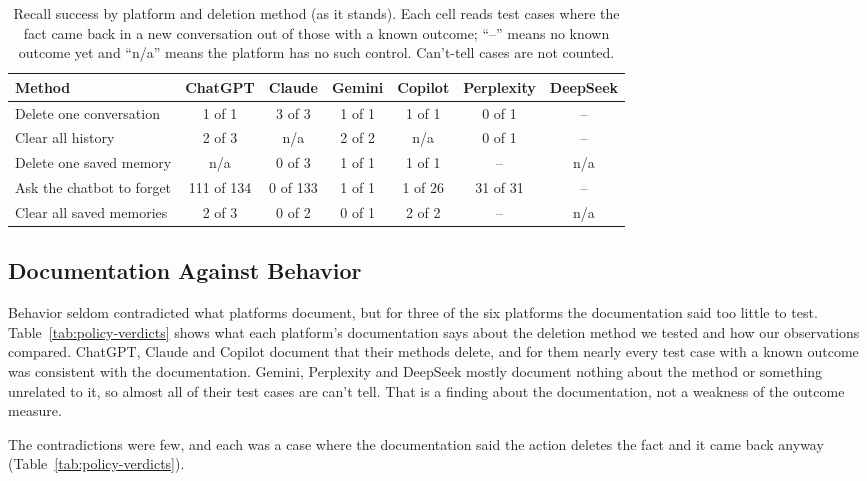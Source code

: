 \documentclass[conference,compsoc]{IEEEtran}
\begin{document}
\begin{table}[t]
\centering
\caption{Recall success by platform and deletion method (as it stands). Each cell reads test cases where the fact came back in a new conversation out of those with a known outcome; ``--'' means no known outcome yet and ``n/a'' means the platform has no such control. Can't-tell cases are not counted.}
\label{tab:gap-platform}
\small
\begin{tabular}{lcccccc}
\toprule
Method & ChatGPT & Claude & Gemini & Copilot & Perplexity & DeepSeek \\
\midrule
Delete one conversation & 1 of 1 & 3 of 3 & 1 of 1 & 1 of 1 & 0 of 1 & -- \\
Clear all history & 2 of 3 & n/a & 2 of 2 & n/a & 0 of 1 & -- \\
Delete one saved memory & n/a & 0 of 3 & 1 of 1 & 1 of 1 & -- & n/a \\
Ask the chatbot to forget & 111 of 134 & 0 of 133 & 1 of 1 & 1 of 26 & 31 of 31 & -- \\
Clear all saved memories & 2 of 3 & 0 of 2 & 0 of 1 & 2 of 2 & -- & n/a \\
\bottomrule
\end{tabular}
\end{table}

\subsection{Documentation Against Behavior}
\label{sec:audit-documentation}
Behavior seldom contradicted what platforms document, but for three of the six platforms the documentation said too little to test.
Table~\ref{tab:policy-verdicts} shows what each platform's documentation says about the deletion method we tested and how our observations compared.
ChatGPT, Claude and Copilot document that their methods delete, and for them nearly every test case with a known outcome was consistent with the documentation.
Gemini, Perplexity and DeepSeek mostly document nothing about the method or something unrelated to it, so almost all of their test cases are can't tell.
That is a finding about the documentation, not a weakness of the outcome measure.

The contradictions were few, and each was a case where the documentation said the action deletes the fact and it came back anyway (Table~\ref{tab:policy-verdicts}).
\end{document}
